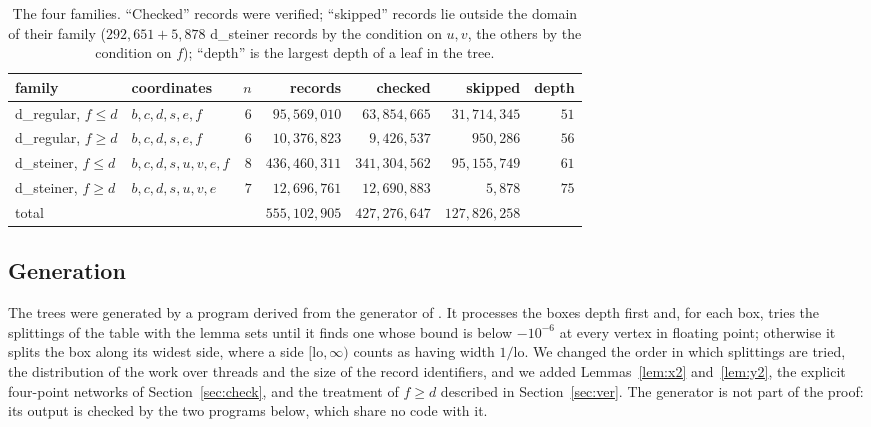 \documentclass[11pt]{amsart}
\theoremstyle{definition}
\theoremstyle{remark}
\numberwithin{equation}{section}
\newcommand{\NREC}{555{,}102{,}905}
\newcommand{\NOK}{427{,}276{,}647}
\begin{document}
\begin{table}[ht]
\centering
\small
\begin{tabular}{@{}llrrrrr@{}}
\toprule
family & coordinates & $n$ & records & checked & skipped & depth\\
\midrule
d\_regular, $f\le d$ & $b,c,d,s,e,f$ & $6$ & $95{,}569{,}010$ & $63{,}854{,}665$ & $31{,}714{,}345$ & $51$\\
d\_regular, $f\ge d$ & $b,c,d,s,e,f$ & $6$ & $10{,}376{,}823$ & $9{,}426{,}537$ & $950{,}286$ & $56$\\
d\_steiner, $f\le d$ & $b,c,d,s,u,v,e,f$ & $8$ & $436{,}460{,}311$ & $341{,}304{,}562$ & $95{,}155{,}749$ & $61$\\
d\_steiner, $f\ge d$ & $b,c,d,s,u,v,e$ & $7$ & $12{,}696{,}761$ & $12{,}690{,}883$ & $5{,}878$ & $75$\\
\midrule
total & & & $\NREC$ & $\NOK$ & $127{,}826{,}258$ &\\
\bottomrule
\end{tabular}
\caption{The four families. ``Checked'' records were verified; ``skipped'' records lie outside the domain of their family ($292{,}651+5{,}878$ d\_steiner records by the condition on $u,v$, the others by the condition on $f$); ``depth'' is the largest depth of a leaf in the tree.}\label{tab:cases}
\end{table}

\subsection{Generation}
The trees were generated by a program derived from the generator of \cite{KHSHGW}. It processes the boxes depth first and, for each box, tries the splittings of the table with the lemma sets until it finds one whose bound is below $-10^{-6}$ at every vertex in floating point; otherwise it splits the box along its widest side, where a side $[\mathrm{lo},\infty)$ counts as having width $1/\mathrm{lo}$. We changed the order in which splittings are tried, the distribution of the work over threads and the size of the record identifiers, and we added Lemmas~\ref{lem:x2} and~\ref{lem:y2}, the explicit four-point networks of Section~\ref{sec:check}, and the treatment of $f\ge d$ described in Section~\ref{sec:ver}. The generator is not part of the proof: its output is checked by the two programs below, which share no code with it.
\end{document}
